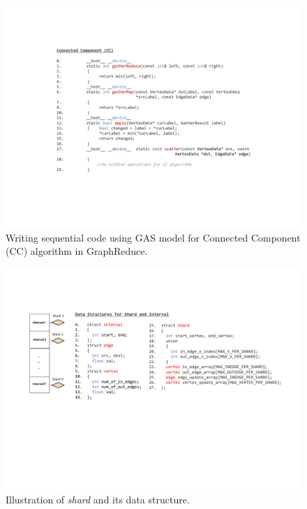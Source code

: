 \begin{figure}[!t]
\centering
\includegraphics[width=\textwidth,height=\textheight,keepaspectratio]{figures/CC_code.pdf}
\caption{Writing sequential code using GAS model for Connected Component (CC) algorithm in GraphReduce. }
\label{fig:seq}
\end{figure}


\begin{figure}[!t]
\centering
\includegraphics[width=\textwidth,height=\textheight,keepaspectratio]{figures/shard.pdf}
\caption{Illustration of \textit{shard} and its data structure. }
\label{fig:shard}
\end{figure}




